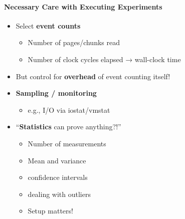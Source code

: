 \paragraph{Necessary Care with Executing Experiments}
\begin{itemize}
\item Select \textbf{event counts}
  \begin{itemize}
  \item Number of pages/chunks read
  \item Number of clock cycles elapsed → wall-clock time
  \end{itemize}

\item But control for \textbf{overhead} of event counting
  itself!

\item \textbf{Sampling / monitoring}
  \begin{itemize}
  \item e.g., I/O via iostat/vmstat
  \end{itemize}

\item ``\textbf{Statistics} can prove anything?!''
  \begin{itemize}
  \item Number of measurements
  \item Mean and variance
  \item confidence intervals
  \item dealing with outliers
  \item Setup matters!
  \end{itemize}
\end{itemize}


